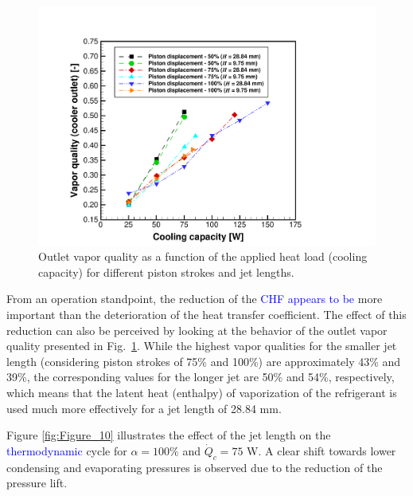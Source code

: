 \documentclass[review,preprint,12pt]{elsarticle}
\begin{document}
\begin{figure}[!htp]
\centering
\includegraphics[angle=0,scale=0.375]{Figure_9.pdf}
\caption{Outlet vapor quality as a function of the applied heat load (cooling capacity) for different piston strokes and jet lengths.}
\label{fig:Figure_9}
\end{figure}

From an operation standpoint, the reduction of the  \textcolor{blue}{CHF appears to be} more important than the deterioration of the heat transfer coefficient. The effect of this reduction can also be perceived by looking at the behavior of the outlet vapor quality presented in Fig.~\ref{fig:Figure_9}. While the highest vapor qualities for the smaller jet length (considering piston strokes of 75\% and 100\%) are approximately 43\% and 39\%, the corresponding values for the longer jet are 50\% and 54\%, respectively, which means that the latent heat (enthalpy) of vaporization of the refrigerant is used much more effectively for a jet length of 28.84 mm. 

Figure \ref{fig:Figure_10} illustrates the effect of the jet length on the  \textcolor{blue}{thermodynamic} cycle for $\alpha = 100\%$ and $\dot{Q}_{c} = 75$ W. A clear shift towards lower condensing and evaporating pressures is observed due to the reduction of the pressure lift. 
\end{document}
